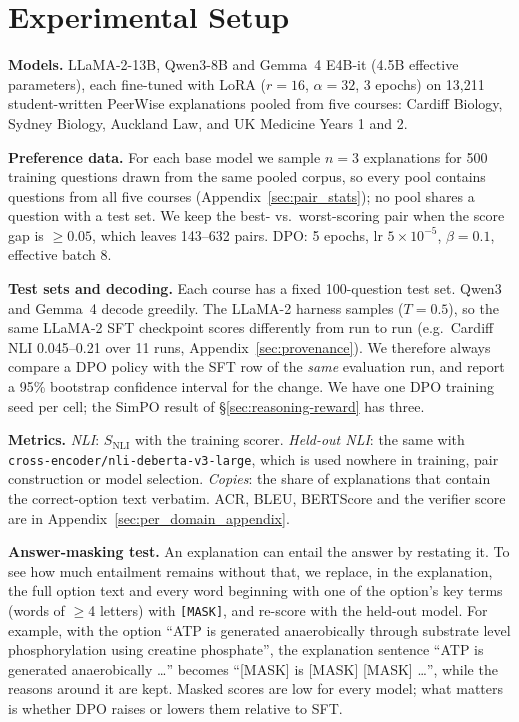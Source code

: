 \section{Experimental Setup}
\label{sec:experimental_setup}
\label{sec:setup}

\textbf{Models.} LLaMA-2-13B, Qwen3-8B and Gemma~4 E4B-it (4.5B effective parameters), each fine-tuned with LoRA ($r{=}16$, $\alpha{=}32$, 3 epochs) on 13{,}211 student-written PeerWise explanations \citep{bao2025exploring} pooled from five courses: Cardiff Biology, Sydney Biology, Auckland Law, and UK Medicine Years 1 and 2.

\textbf{Preference data.} For each base model we sample $n{=}3$ explanations for 500 training questions drawn from the same pooled corpus, so every pool contains questions from all five courses (Appendix~\ref{sec:pair_stats}); no pool shares a question with a test set. We keep the best- vs.\ worst-scoring pair when the score gap is $\geq 0.05$, which leaves 143--632 pairs. DPO: 5 epochs, lr $5{\times}10^{-5}$, $\beta{=}0.1$, effective batch 8.

\textbf{Test sets and decoding.} Each course has a fixed 100-question test set. Qwen3 and Gemma~4 decode greedily. The LLaMA-2 harness samples ($T{=}0.5$), so the same LLaMA-2 SFT checkpoint scores differently from run to run (e.g.\ Cardiff NLI 0.045--0.21 over 11 runs, Appendix~\ref{sec:provenance}). We therefore always compare a DPO policy with the SFT row of the \emph{same} evaluation run, and report a 95\% bootstrap confidence interval for the change. We have one DPO training seed per cell; the SimPO result of \S\ref{sec:reasoning-reward} has three.

\textbf{Metrics.} \emph{NLI}: $S_\text{NLI}$ with the training scorer. \emph{Held-out NLI}: the same with \texttt{cross-encoder/nli-deberta-v3-large}, which is used nowhere in training, pair construction or model selection. \emph{Copies}: the share of explanations that contain the correct-option text verbatim. ACR, BLEU, BERTScore and the verifier score are in Appendix~\ref{sec:per_domain_appendix}.

\textbf{Answer-masking test.}\label{sec:masking} An explanation can entail the answer by restating it. To see how much entailment remains without that, we replace, in the explanation, the full option text and every word beginning with one of the option's key terms (words of $\geq$4 letters) with \texttt{[MASK]}, and re-score with the held-out model. For example, with the option ``ATP is generated anaerobically through substrate level phosphorylation using creatine phosphate'', the explanation sentence ``ATP is generated anaerobically \ldots'' becomes ``[MASK] is [MASK] [MASK] \ldots'', while the reasons around it are kept. Masked scores are low for every model; what matters is whether DPO raises or lowers them relative to SFT.


